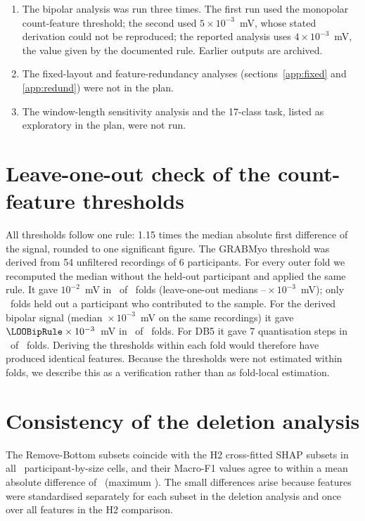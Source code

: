 \documentclass{iopjournal}
\begin{document}
\begin{enumerate}
\item The bipolar analysis was run three times. The first run used the monopolar count-feature threshold; the second used $5 \times 10^{-3}$~mV, whose stated derivation could not be reproduced; the reported analysis uses $4 \times 10^{-3}$~mV, the value given by the documented rule. Earlier outputs are archived.
\item The fixed-layout and feature-redundancy analyses (sections~\ref{app:fixed} and \ref{app:redund}) were not in the plan.
\item The window-length sensitivity analysis and the 17-class task, listed as exploratory in the plan, were not run.
\end{enumerate}

\section{Leave-one-out check of the count-feature thresholds}
\label{app:threshold}
All thresholds follow one rule: 1.15 times the median absolute first difference of the signal, rounded to one significant figure. The GRABMyo threshold was derived from 54 unfiltered recordings of 6 participants. For every outer fold we recomputed the median without the held-out participant and applied the same rule. It gave $10^{-2}$~mV in \LOOMonoIdentical\ of \LOOMonoFolds\ folds (leave-one-out medians \LOOMonoMin--\LOOMonoMax${}\times 10^{-3}$~mV); only \LOOMonoInProbe\ folds held out a participant who contributed to the sample. For the derived bipolar signal (median \LOOBipPooled${}\times 10^{-3}$~mV on the same recordings) it gave $\LOOBipRule \times 10^{-3}$~mV in \LOOBipIdentical\ of \LOOBipFolds\ folds. For DB5 it gave 7 quantisation steps in \LOODBFiveIdentical\ of \LOODBFiveFolds\ folds. Deriving the thresholds within each fold would therefore have produced identical features. Because the thresholds were not estimated within folds, we describe this as a verification rather than as fold-local estimation.

\section{Consistency of the deletion analysis}
\label{app:faith}
The Remove-Bottom subsets coincide with the H2 cross-fitted SHAP subsets in all \FaithProtocolCells\ participant-by-size cells, and their Macro-F1 values agree to within a mean absolute difference of \FaithProtocolMeanDiff\ (maximum \FaithProtocolMaxDiff). The small differences arise because features were standardised separately for each subset in the deletion analysis and once over all features in the H2 comparison.
\end{document}
